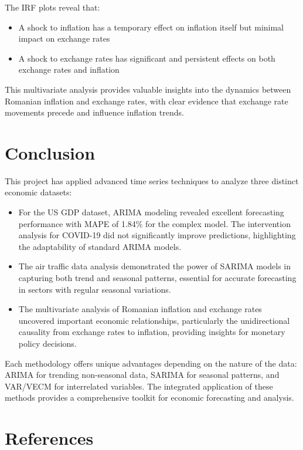 \documentclass[11pt,a4paper]{article}
\begin{document}
The IRF plots reveal that:
\begin{itemize}
    \item A shock to inflation has a temporary effect on inflation itself but minimal impact on exchange rates
    \item A shock to exchange rates has significant and persistent effects on both exchange rates and inflation
\end{itemize}

This multivariate analysis provides valuable insights into the dynamics between Romanian inflation and exchange rates, with clear evidence that exchange rate movements precede and influence inflation trends.

\section{Conclusion}

This project has applied advanced time series techniques to analyze three distinct economic datasets:

\begin{itemize}
    \item For the US GDP dataset, ARIMA modeling revealed excellent forecasting performance with MAPE of 1.84\% for the complex model. The intervention analysis for COVID-19 did not significantly improve predictions, highlighting the adaptability of standard ARIMA models.

    \item The air traffic data analysis demonstrated the power of SARIMA models in capturing both trend and seasonal patterns, essential for accurate forecasting in sectors with regular seasonal variations.

    \item The multivariate analysis of Romanian inflation and exchange rates uncovered important economic relationships, particularly the unidirectional causality from exchange rates to inflation, providing insights for monetary policy decisions.
\end{itemize}

Each methodology offers unique advantages depending on the nature of the data: ARIMA for trending non-seasonal data, SARIMA for seasonal patterns, and VAR/VECM for interrelated variables. The integrated application of these methods provides a comprehensive toolkit for economic forecasting and analysis.

\section{References}
\end{document}

